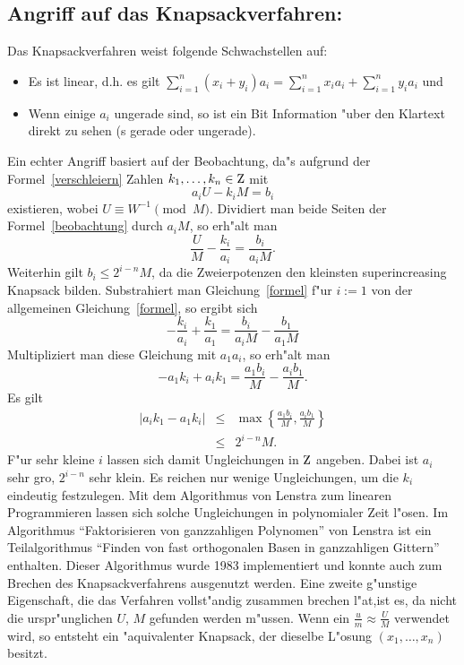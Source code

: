     \subsection*{Angriff auf das Knapsackverfahren:}
     Das Knapsackverfahren weist folgende Schwachstellen auf:
     \begin{itemize}
        \item Es ist linear, d.h. es gilt 
          $\sum_{i=1}^n (x_i + y_i)a_i = \sum_{i=1}^n x_i a_i + \sum_{i=1}^n y_i a_i$ und 
        \item Wenn einige $a_i$ ungerade sind, so ist ein Bit Information 
          "uber den Klartext direkt zu sehen (s gerade oder ungerade).
     \end{itemize}
     Ein echter Angriff basiert auf der Beobachtung, da"s aufgrund der 
     Formel~\ref{verschleiern} Zahlen $k_1, \ldots ,k_n \in \Z$ mit
     \begin{equation} 
       a_i U - k_i M = b_i \label{beobachtung} 
     \end{equation}
     existieren, wobei $U \equiv W^{-1} \pmod M$. Dividiert man beide Seiten der 
     Formel~\ref{beobachtung} durch $a_i M$, so erh"alt man
     \begin{equation} 
       \frac{U}{M} - \frac{k_i}{a_i} = \frac{b_i}{a_i M}. \label{formel} 
     \end{equation}
     Weiterhin gilt $b_i \le 2^{i-n} M$, da die Zweierpotenzen den 
     kleinsten superincreasing Knapsack bilden. Substrahiert man 
     Gleichung~\ref{formel} f"ur $i:=1$ von der
     allgemeinen Gleichung~\ref{formel}, so ergibt sich
     $$ -\frac{k_i}{a_i}+\frac{k_1}{a_1}  =  \frac{b_i}{a_i M} - \frac{b_1}{a_1 M} $$
     Multipliziert man diese Gleichung mit $a_1 a_i$, so erh"alt man
     \begin{equation} 
       -a_1 k_i + a_i k_1 = \frac{a_1 b_i}{M} - \frac{a_i b_1}{M}. 
     \end{equation}
     Es gilt 
     \begin{eqnarray}
       |a_i k_1 - a_1 k_i| & \le & \max \left\{ \frac{a_1 b_i}{M}, \frac{a_i b_1}{M}\right\} \\
                           & \le & 2^{i-n} M.
     \end{eqnarray}
      F"ur sehr kleine $i$ lassen sich damit Ungleichungen in $\Z$ angeben. 
      Dabei ist $a_i$ sehr gro\3, $2^{i-n}$ sehr klein. Es reichen nur wenige 
      Ungleichungen, um die $k_i$ eindeutig festzulegen. Mit dem Algorithmus 
      von Lenstra zum linearen Programmieren lassen sich solche Ungleichungen 
      in polynomialer Zeit l"osen. Im Algorithmus "`Faktorisieren von 
      ganzzahligen Polynomen"' von Lenstra ist ein Teilalgorithmus 
      "`Finden von fast orthogonalen Basen in ganzzahligen Gittern"' enthalten. 
      Dieser Algorithmus wurde 1983 implementiert und konnte auch zum Brechen 
      des Knapsackverfahrens ausgenutzt werden. Eine zweite g"unstige Eigenschaft, 
      die das Verfahren vollst"andig zusammen brechen l"a\3t,ist es, da\3 nicht 
      die urspr"unglichen $U$, $M$ gefunden werden m"ussen. Wenn ein 
      $\frac{u}{m} \approx \frac{U}{M}$ verwendet wird, so entsteht ein 
      "aquivalenter Knapsack, der dieselbe L"osung $(x_1,\ldots, x_n)$ besitzt.
